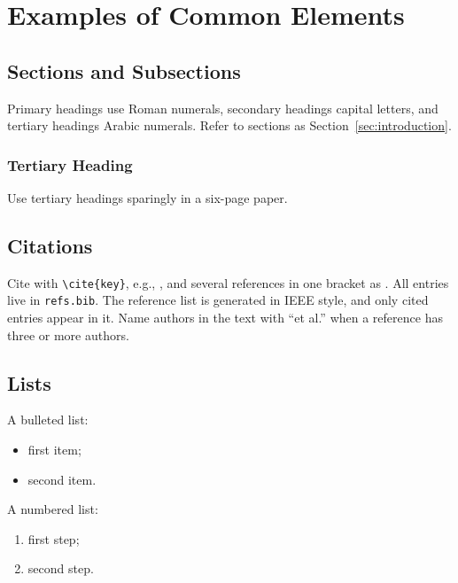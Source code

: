 
\section{Examples of Common Elements}
\label{sec:examples}


\subsection{Sections and Subsections}
Primary headings use Roman numerals, secondary headings capital letters, and tertiary headings Arabic numerals. Refer to sections as Section~\ref{sec:introduction}.

\subsubsection{Tertiary Heading}
Use tertiary headings sparingly in a six-page paper.

\subsection{Citations}
Cite with \verb|\cite{key}|, e.g., \cite{oxe2023}, and several references in one bracket as \cite{oxe2023,khazatsky2024droid}. All entries live in \texttt{refs.bib}. The reference list is generated in IEEE style, and only cited entries appear in it. Name authors in the text with ``et al.'' when a reference has three or more authors.

\subsection{Lists}
A bulleted list:
\begin{itemize}
  \item first item;
  \item second item.
\end{itemize}
A numbered list:
\begin{enumerate}
  \item first step;
  \item second step.
\end{enumerate}

